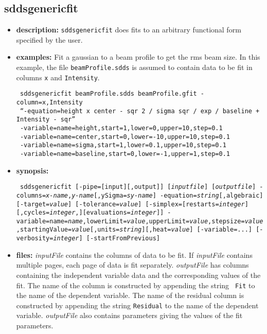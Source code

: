 \newpage
\subsection{sddsgenericfit}
\label{sddsgenericfit}

\begin{itemize}
\item {\bf description:}
{\tt sddsgenericfit} does fits to an arbitrary functional form specified by the user.

\item {\bf examples:} 
Fit a gaussian to a beam profile to get the rms beam size.  In this example, the
file \verb|beamProfile.sdds| is assumed to contain data to be fit in columns
\verb|x| and \verb|Intensity|.
\begin{flushleft}{\tt
sddsgenericfit beamProfile.sdds beamProfile.gfit -column=x,Intensity \\\
``-equation=height x center - sqr 2 / sigma sqr / exp / baseline + Intensity - sqr'' \\\
-variable=name=height,start=1,lower=0,upper=10,step=0.1 \\\
-variable=name=center,start=0,lower=-10,upper=10,step=0.1 \\\
-variable=name=sigma,start=1,lower=0.1,upper=10,step=0.1 \\\
-variable=name=baseline,start=0,lower=-1,upper=1,step=0.1 
}\end{flushleft}
\item {\bf synopsis:} 
\begin{flushleft}{\tt
sddsgenericfit 
[-pipe=[input][,output]] [{\em inputfile}] [{\em outputfile}] 
-columns={\em x-name},{\em y-name}[,ySigma={\em sy-name}] 
-equation={\em string}[,algebraic] [-target={\em value}] [-tolerance={\em value}]
[-simplex=[restarts={\em integer}][,cycles={\em integer},][evaluations={\em integer}]]
-variable=name={\em name},lowerLimit={\em value},upperLimit={\em value},stepsize={\em value},startingValue={\em value}[,units={\em string}][,heat={\em value}]
[-variable=...] [-verbosity={\em integer}] [-startFromPrevious]
}\end{flushleft}

\item {\bf files:} {\em inputFile} contains the columns of data to be
fit.  If {\em inputFile} contains multiple pages, each page of data is
fit separately.  {\em outputFile} has columns containing the
independent variable data and the corresponding values of the fit.
The name of the column is constructed by appending the string {\tt
Fit} to the name of the dependent variable.  The name of the residual
column is constructed by appending the string {\tt Residual} to the
name of the dependent variable.  {\em outputFile} also contains
parameters giving the values of the fit parameters.


\end{itemize}
